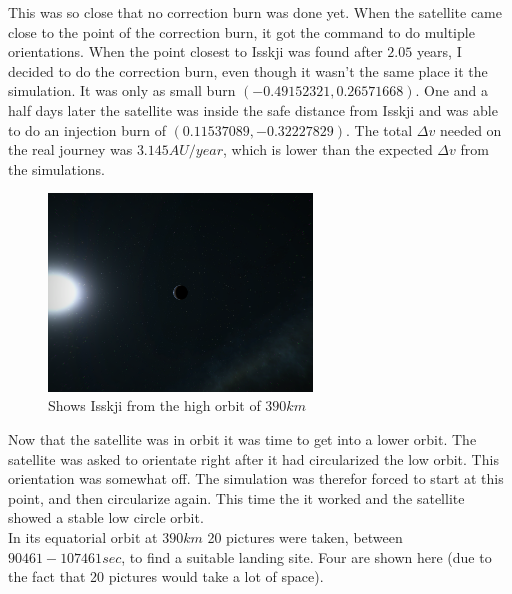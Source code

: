 \documentclass[a4paper, 10pt]{article}
\begin{document}
This was so close that no correction burn was done yet. When the satellite came close to the point of the correction burn, it got the command to do multiple orientations. When the point closest to Isskji was found after $2.05$ years, I decided to do the correction burn, even though it wasn't the same place it the simulation. It was only as small burn $(-0.49152321, 0.26571668)$. One and a half days later the satellite was inside the safe distance from Isskji and was able to do an injection burn of $(0.11537089, -0.32227829)$. The total $\Delta v$ needed on the real journey was $3.145 AU/year$, which is lower than the expected $\Delta v$ from the simulations.\\

\begin{figure}[H]
\centering
\includegraphics[width = 70mm]{Image0009.png}
\caption{Shows Isskji from the high orbit of $390 km$}
\end{figure}

Now that the satellite was in orbit it was time to get into a lower orbit. The satellite was asked to orientate right after it had circularized the low orbit. This orientation was somewhat off. The simulation was therefor forced to start at this point, and then circularize again. This time the it worked and the satellite showed a stable low circle orbit.\\

In its equatorial orbit at $390 km$ 20 pictures were taken, between $ 90461-107461 sec$, to find a suitable landing site. Four are shown here (due to the fact that 20 pictures would take a lot of space).
\end{document}
